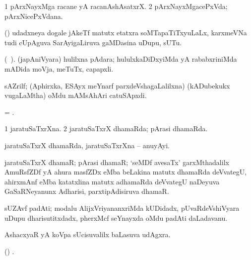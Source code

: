 \bentry
{} 
\gl{\nA} 
\bmng
\bnum
\num{1} pArxNayxMga racane yA racanAshAsatxrX. 
\num{2} pArxNayxMgacePxVda; pArxNicePxVdana.
\enum
\emng
\eentry

\bentry
{} 
\gl{\nA} 
\bmng
(\AmA) udadxneya dogale jAkeTf matutx etatxra soMTapaTiTxyuLaLx, karxmeVNa tudi cUpAguva SarAyigaLiruva gaMDasina uDupu, sUTu.
\emng
\eentry

\bentry
{} 
\gl{\nA}
\bmng
(\bava\ ). (japAniVyara) hulilxna pAdara; hululxkaDiDxyiMda yA rababxriniMda mADida moVja, meTuTx, capapxli. 
\emng
\eentry

\bentry
{} 
\gl{\nA} 
\bmng
sAZrilf; (Aphirxka, ESAyx meYnarf parxdeVshagaLalilxna) (kADubekukx \mo vugaLaMtha) oMdu mAMsAhAri catuSApxdi.
\emng
\eentry

\bentry
{} 
\gl{\nA}  
\bmng
= .
\emng
\eentry

\bentry
{} 
\gl{\gu} 
\bmng
\bnum
\num{1} jaratuSaTxrXna. 
\num{2} jaratuSaTxrX dhamaRda; pArasi dhamaRda.
\enum
\emng
\eentry

\bentry
{} 
\gl{\nA} 
\bmng
jaratuSaTxrX dhamaRda, jaratuSaTxrXna -- anuyAyi.
\emng
\eentry

\bentry
{}  
\gl{\nA} 
\bmng
jaratuSaTxrX dhamaR; pArasi dhamaR; `seMDf avesaTx' garxMthadalilx  AmuRsfZDf yA ahura masfZDx eMba beLakina matutx dhamaRda deVvategU, ahirxmAnf eMba katatxlina matutx adhamaRda deVvategU naDeyuva GaSaRNeyanunx Adharisi, parxtipAdisiruva dhamaR.
\emng
\eentry

\bentry
{} 
\gl{\nA} 
\bmng
sUZAvf padAti; modalu AlijxVriyananxriMda kUDidadx, pUvaRdeVshiVyara uDupu dharisutitxdadx, pherxMcf seYnayxda oMdu padAti daLadavanu. 
\emng
\eentry

\bentry
{} 
\gl{\BAavayx} 
\bmng
AshacxyaR yA koVpa sUcisuvalilx baLasuva udAgxra.
\emng
\eentry

\bentry
{} 
\gl{\saMkiSx} 
\bmng
{}
\emng
\eentry

\bentry
{}  
\gl{\saMkeV} 
\bmng
(\ravi) .
\emng
\eentry

